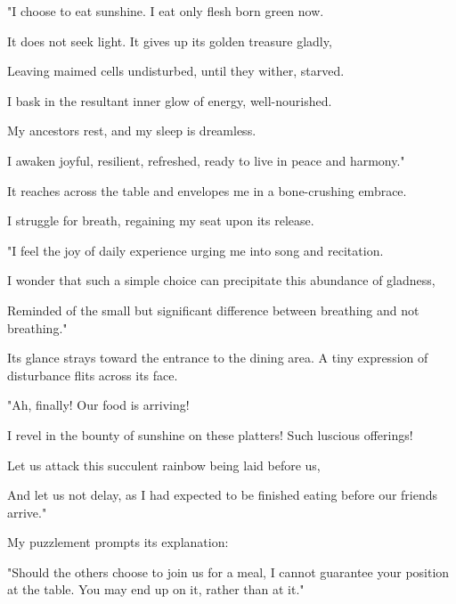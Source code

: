"I choose to eat sunshine. I eat only flesh born green now.

It does not seek light. It gives up its golden treasure gladly,

Leaving maimed cells undisturbed, until they wither, starved.

I bask in the resultant inner glow of energy, well-nourished.

My ancestors rest, and my sleep is dreamless.

I awaken joyful, resilient, refreshed, ready to live in peace and
harmony."

It reaches across the table and envelopes me in a bone-crushing embrace.

I struggle for breath, regaining my seat upon its release.

"I feel the joy of daily experience urging me into song and recitation.

I wonder that such a simple choice can precipitate this abundance of
gladness,

Reminded of the small but significant difference between breathing and
not breathing."

Its glance strays toward the entrance to the dining area. A tiny
expression of disturbance flits across its face.

"Ah, finally! Our food is arriving!

I revel in the bounty of sunshine on these platters! Such luscious
offerings!

Let us attack this succulent rainbow being laid before us,

And let us not delay, as I had expected to be finished eating before our
friends arrive."

My puzzlement prompts its explanation:

"Should the others choose to join us for a meal, I cannot guarantee your
position at the table. You may end up on it, rather than at it."
